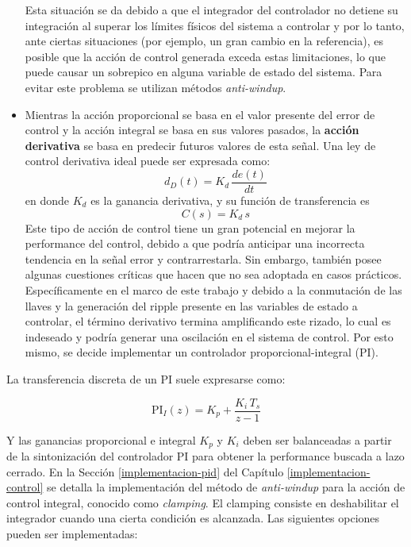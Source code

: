 \begin{itemize}
  Esta situación se da debido a que el integrador del controlador no detiene su integración al superar los límites físicos del sistema a controlar y por lo tanto, ante ciertas situaciones (por ejemplo, un gran cambio en la referencia), es posible que la acción de control generada exceda estas limitaciones, lo que puede causar un sobrepico en alguna variable de estado del sistema. Para evitar este problema se utilizan métodos \emph{anti-windup}.
  \item Mientras la acción proporcional se basa en el valor presente del error de control y la acción integral se basa en sus valores pasados, la \textbf{acción derivativa} se basa en predecir futuros valores de esta señal. Una ley de control derivativa ideal puede ser expresada como:
  \begin{equation*}
    d_D(t) = K_d \, \frac{d e(t)}{dt}
  \end{equation*}
  en donde $K_d$ es la ganancia derivativa, y su función de transferencia es 
  \begin{equation*}
    C(s) = K_d \, s 
  \end{equation*}
  Este tipo de acción de control tiene un gran potencial en mejorar la performance del control, debido a que podría anticipar una incorrecta tendencia en la señal error y contrarrestarla. Sin embargo, también posee algunas cuestiones críticas que hacen que no sea adoptada en casos prácticos. Específicamente en el marco de este trabajo y debido a la conmutación de las llaves y la generación del ripple presente en las variables de estado a controlar, el término derivativo termina amplificando este rizado, lo cual es indeseado y podría generar una oscilación en el sistema de control. Por esto mismo, se decide implementar un controlador proporcional-integral (PI).
\end{itemize}

La transferencia discreta de un PI suele expresarse como: 

\begin{equation*}
  \mathrm{PI}_I(z) = K_p + \frac{K_i \, T_s}{z-1}
\end{equation*}

Y las ganancias proporcional e integral $K_p$ y $K_i$ deben ser balanceadas a partir de la sintonización del controlador PI para obtener la performance buscada a lazo cerrado. En la Sección \ref{implementacion-pid} del Capítulo \ref{implementacion-control} se detalla la implementación del método de \emph{anti-windup} para la acción de control integral, conocido como \emph{clamping}. El clamping consiste en deshabilitar el integrador cuando una cierta condición es alcanzada. Las siguientes opciones pueden ser implementadas:

